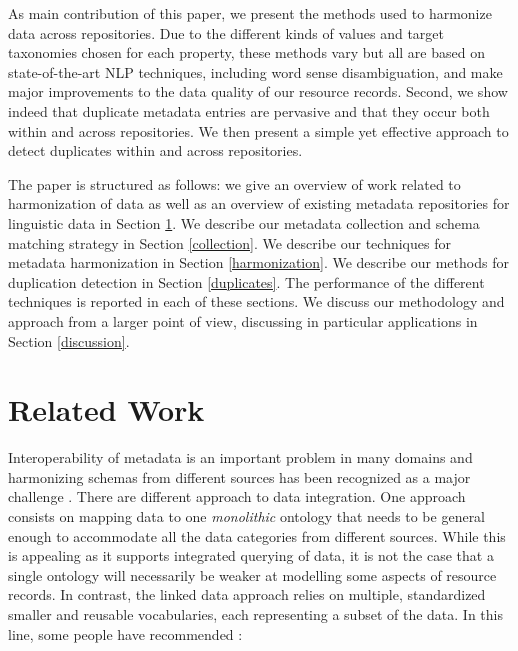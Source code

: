 \documentclass[11pt]{article}
\begin{document}

As main contribution of this paper, we present the methods used to harmonize
data across repositories. Due to the different kinds of values and target
taxonomies chosen for each property, these methods vary but all are based on
state-of-the-art NLP techniques, including word sense disambiguation, and make
major improvements to the data quality of our resource records.
Second, we show indeed that duplicate metadata entries are pervasive and that they occur both within and across repositories. We then present a simple yet effective approach to detect duplicates within and across repositories. 

The paper is structured as follows: we give an overview of work related to harmonization of data as well as an overview of existing metadata repositories for linguistic data in Section \ref{rel_work}. We describe our metadata collection and schema matching strategy in Section \ref{collection}. We describe our techniques for metadata harmonization in Section \ref{harmonization}. We describe our methods for duplication detection in Section \ref{duplicates}. The performance of the different techniques is reported in each of these sections. We discuss our methodology and approach from a larger point of view, discussing in particular applications in Section \ref{discussion}. 


\section{Related Work}

\label{rel_work}

Interoperability of metadata is an important problem in many domains and harmonizing schemas from different sources has been recognized as a major challenge 
\cite{nilsson2010interoperability,khoo2010merging,nogueras2004metadata}. 
There are different approach to data integration. One approach consists on
mapping data to one \emph{monolithic} ontology that needs to be general enough
to accommodate all the data categories from different sources. While this is 
appealing as it supports integrated querying of data, it is not the case that a
single ontology will necessarily be weaker at modelling some aspects of resource
records. In contrast, the linked data approach relies on
multiple, standardized smaller and reusable vocabularies, each representing a 
subset of the data.  In this line, some people have recommended \cite{brooks2006towards}:
\end{document}
